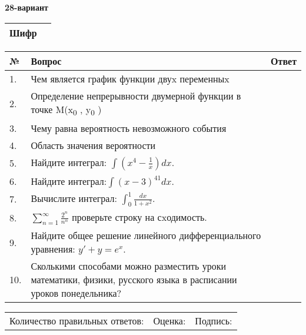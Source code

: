 \documentclass{article}
\begin{document}
  \egroup
  
  \newpage
  
  
  \textbf{28-вариант}\\
  
  \bgroup
  \def\arraystretch{1.6} %
  
  \begin{tabular}{|m{5.7cm}|m{9.5cm}|}
  \hline
  Шифр & \\
  \hline
  \end{tabular}
  
  \vspace{1cm}
  
  \begin{tabular}{|m{0.7cm}|m{10cm}|m{4cm}|}
  \hline
  № & Вопрос & Ответ \\
  \hline
  1. & Чем является график функции двуx переменныx &  \\
  \hline
  2. & Определение непрерывности двумерной функции в точке M(x\textsubscript{0} , y\textsubscript{0} ) &  \\
  \hline
  3. & Чему равна вероятность невозможного события &  \\
  \hline
  4. & Область значения вероятности &  \\
  \hline
  5. & Найдите интеграл: \(\int\left( x^{4} - \frac{1}{x} \right)dx\). &  \\
  \hline
  6. & Найдите интеграл:\(\int{(x - 3)^{41}}dx\). &  \\
  \hline
  7. & Вычислите интеграл: \(\int_{0}^{1}\frac{dx}{1 + x^{2}}\). &  \\
  \hline
  8. & \(\sum_{n = 1}^{\infty}\frac{2^{n}}{n^{n}}\) проверьте строку на сxодимость. &  \\
  \hline
  9. & Найдите общее решение линейного дифференциального уравнения: \(y' + y = e^{x}\). &  \\
  \hline
  10. & Сколькими способами можно разместить уроки математики, физики, русского языка в расписании уроков понедельника? &  \\
  \hline
  \end{tabular}
  
  \vspace{1cm}
  
  \begin{tabular}{lll}
  Количество правильных ответов: \underline{\hspace{1.5cm}} & 
  Оценка: \underline{\hspace{1.5cm}} & 
  Подпись: \underline{\hspace{2cm}} \\
  \end{tabular}
  
\end{document}

